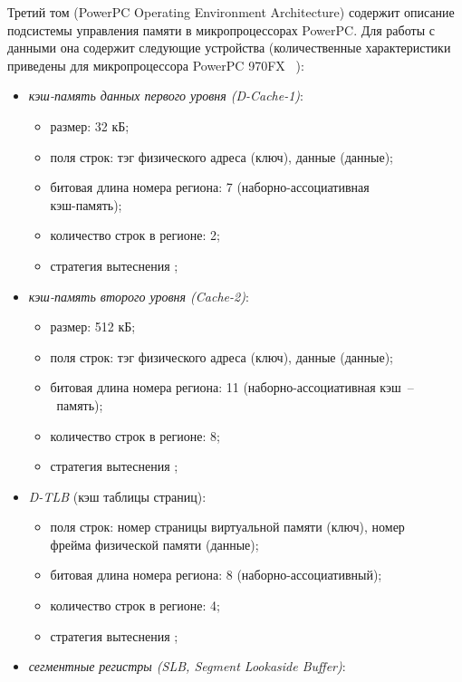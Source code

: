 Третий том (PowerPC Operating Environment Architecture) содержит описание подсистемы управления памяти в микропроцессорах PowerPC. Для работы с данными она содержит следующие устройства (количественные характеристики приведены для микропроцессора PowerPC 970FX
~\cite{PowerPC970FXUserManual}):
\begin{itemize}
  \item \emph{кэш-память данных первого уровня (D-Cache-1)}:
        \begin{itemize}
            \item размер: 32 кБ;
            \item поля строк: тэг физического адреса (ключ), данные (данные);
            \item битовая длина номера региона: 7 (наборно-ассоциативная\\кэш-память);
            \item количество строк в регионе: 2;
            \item стратегия вытеснения \LRU;
        \end{itemize}
  \item \emph{кэш-память второго уровня (Cache-2)}:
        \begin{itemize}
            \item размер: 512 кБ;
            \item поля строк: тэг физического адреса (ключ), данные (данные);
            \item битовая длина номера региона: 11 (наборно-ассоциативная кэш~--~память);
            \item количество строк в регионе: 8;
            \item стратегия вытеснения \LRU;
        \end{itemize}
  \item \emph{D-TLB} (кэш таблицы страниц):
        \begin{itemize}
            \item поля строк: номер страницы виртуальной памяти (ключ), номер\\фрейма физической памяти (данные);
            \item битовая длина номера региона: 8 (наборно-ассоциативный);
            \item количество строк в регионе: 4;
            \item стратегия вытеснения \LRU;
        \end{itemize}
  \item \emph{сегментные регистры (SLB, Segment Lookaside Buffer)}:

\end{itemize}
